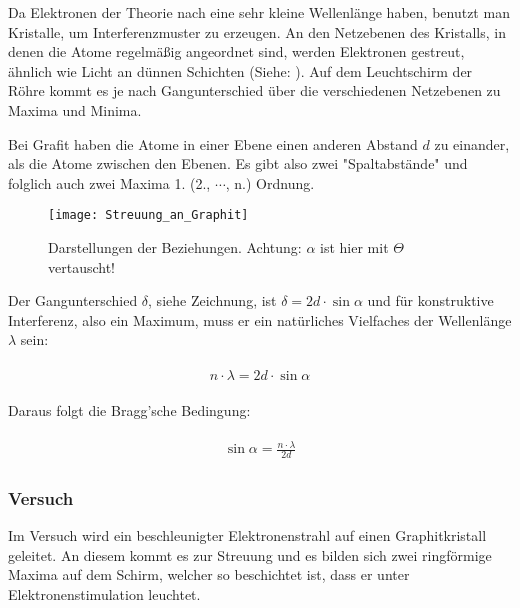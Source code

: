 Da Elektronen der Theorie nach eine sehr kleine Wellenlänge haben, benutzt man Kristalle, um Interferenzmuster zu erzeugen. An den Netzebenen des Kristalls, in denen die Atome regelmäßig angeordnet sind, werden Elektronen gestreut, ähnlich wie Licht an dünnen Schichten (Siehe: ). Auf dem Leuchtschirm der Röhre kommt es je nach Gangunterschied über die verschiedenen Netzebenen zu Maxima und Minima.

\begin{Wichtig}
	Bei Grafit haben die Atome in einer Ebene einen anderen Abstand $d$ zu einander, als die Atome zwischen den Ebenen. Es gibt also zwei "Spaltabstände" und folglich auch zwei Maxima 1. (2., $\cdots$, n.) Ordnung.
\end{Wichtig}

\begin{figure}[h!]
	\centering 
	\texttt{[image: Streuung\_an\_Graphit]}
	\caption{Darstellungen der Beziehungen. Achtung: $\alpha$ ist hier mit $\Theta$ vertauscht!}
	\label{fig:e-angrafit}
\end{figure}

Der Gangunterschied $\delta$, siehe Zeichnung, ist $\delta = 2d \cdot \sin{\alpha}$ und für konstruktive Interferenz, also ein Maximum, muss er ein natürliches Vielfaches der Wellenlänge $\lambda$ sein:

\begin{align}
\begin{split}
	n \cdot \lambda = 2d \cdot \sin{\alpha}
\end{split}
\end{align}

\noindent Daraus folgt die Bragg'sche Bedingung:

\begin{align}
\begin{split}
	\sin{\alpha} = \frac{n \cdot \lambda}{2d}
\end{split}
\end{align}


\subsubsection{Versuch}

Im Versuch wird ein beschleunigter Elektronenstrahl auf einen Graphitkristall geleitet. An diesem kommt es zur Streuung und es bilden sich zwei ringförmige Maxima auf dem Schirm, welcher so beschichtet ist, dass er unter Elektronenstimulation leuchtet.

